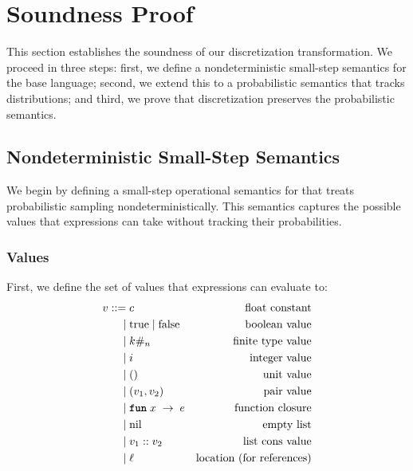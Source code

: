\section{Soundness Proof}\label{sec:soundness}

This section establishes the soundness of our discretization transformation. We proceed in three steps: first, we define a nondeterministic small-step semantics for the base language; second, we extend this to a probabilistic semantics that tracks distributions; and third, we prove that discretization preserves the probabilistic semantics.

\subsection{Nondeterministic Small-Step Semantics}

We begin by defining a small-step operational semantics for \Slice{} that treats probabilistic sampling nondeterministically. This semantics captures the possible values that expressions can take without tracking their probabilities.

\subsubsection{Values}

First, we define the set of values that expressions can evaluate to:
\begin{align*}
v ::= &\; c                                  & \text{float constant} \\
    | &\; \text{true} \mid \text{false}      & \text{boolean value} \\
    | &\; k\#_{n}                    & \text{finite type value} \\
    | &\; i                                  & \text{integer value} \\
    | &\; ()                                 & \text{unit value} \\
    | &\; (v_1, v_2)                         & \text{pair value} \\
    | &\; \textnormal{\ttfamily\bfseries fun} \; x \; \rightarrow \; e    & \text{function closure} \\
    | &\; \text{nil}                         & \text{empty list} \\
    | &\; v_1 :: v_2                         & \text{list cons value} \\
    | &\; \ell                               & \text{location (for references)}
\end{align*}

